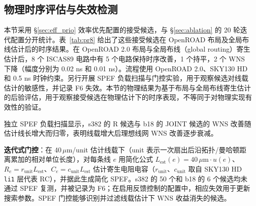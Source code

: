 \documentclass[twocolumn,10pt,fontset=windows]{ctexart}
\begin{document}
\subsection{物理时序评估与失效检测}\label{sec:phys_closure}

本节采用 \S\ref{sec:eff_prio} 效率优先配置的接受候选，与 \S\ref{sec:ablation} 的 20 轮迭代配置分开统计。表~\ref{tab:pr8} 给出了这些接受候选在 OpenROAD 布局及全局布线估计后的时序结果。在 OpenROAD 2.0 布局与全局布线（global routing）寄生估计后，8 个 ISCAS89 电路中有 5 个电路保持时序改善，1 个持平，2 个 WNS 下降（幅度分别为 0.02 ns 和 0.01 ns）。流程使用 OpenROAD 2.0、SKY130 HD 和 0.5 ns 时钟约束。另行开展 SPEF 负载扫描与门控实验，用于观察候选对线载估计的敏感性，并记录 F6 失效。本节的物理结果为基于布局与全局布线寄生估计的后验评估，用于观察接受候选在物理估计下的时序表现，不等同于对物理实现有效性的验证。


独立 SPEF 负载扫描显示，s382 的 R 候选与 b18 的 JOINT 候选的 WNS 改善随估计线长增大而归零，表明线载增大后理想线网 WNS 改善逐步衰减。

\textbf{迭代式门控}：在 40\,$\mu$m/unit 估计线载下（unit 表示一次扇出后沿拓扑/曼哈顿距离累加的相对单位长度），对每条线 $e$ 用简化公式 $L_{\mathrm{est}}(e)=40\,\mu\mathrm{m} \cdot u(e)$、$R_e=r_{\mathrm{unit}}L_{\mathrm{est}}$、$C_e=c_{\mathrm{unit}}L_{\mathrm{est}}$ 估计寄生电阻电容（$r_{\mathrm{unit}}$、$c_{\mathrm{unit}}$ 取自 SKY130 HD \texttt{li1} 层代表 RC），并据此生成简化 SPEF。s382 的 50 个和 b18 的 6 个候选均未通过 SPEF 复测，并被记录为 F6；在启用反馈控制的配置中，相应失效用于更新搜索参数。SPEF 门控能够识别并过滤线载估计下 WNS 收益消失的候选。
\end{document}

